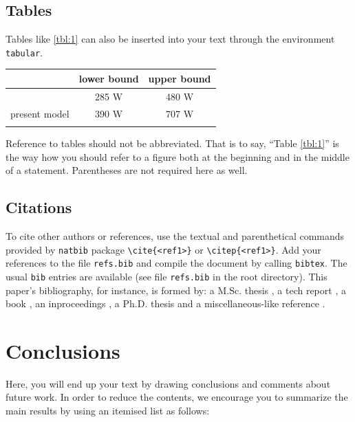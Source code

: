 \documentclass[date]{ppgem}
\begin{document}
\begin{multicols}{2}
\subsection{Tables}

Tables like \ref{tbl:1} can also be inserted into your text through the
environment \verb|tabular|.

\begin{center}
  \captionsetup{type=table}
  \begin{tabular}{ccc}
    \hline
    & lower bound & upper bound\\
    \hline
    \citet{ambrosini2004} & 285 W & 480 W\\
    present model & 390 W & 707 W\\
    \hline\\
  \end{tabular}
  \label{tbl:1}
\end{center}

Reference to tables should not be abbreviated. That is to say, ``Table
\ref{tbl:1}'' is the way how you should refer to a figure both at the
beginning and in the middle of a statement. Parentheses are not required
here as well. \subsection{Citations}

To cite other authors or references, use the textual and parenthetical
commands provided by \verb|natbib| package \verb|\cite{<ref1>}| or
\verb|\citep{<ref1>}|. Add your references to the file \verb|refs.bib|
and compile the document by calling \verb|bibtex|. The usual \verb|bib|
entries are available (see file \verb|refs.bib| in the root directory).
This paper's bibliography, for instance, is formed by: a M.Sc. thesis
\citep{rabellomsc2007}, a tech report \cite{amarante2001}, a book
\citep{batchelor1994}, an inproceedings \cite{lima2009}, a Ph.D. thesis
\citep{loureirophd2008} and a miscellaneous-like reference
\citep{mangiavacchi2000}.

\section{Conclusions}

Here, you will end up your text by drawing conclusions and comments
about future work. In order to reduce the contents, we encourage you to
summarize the main results by using an itemised list as follows:


\end{multicols}
\end{document}
